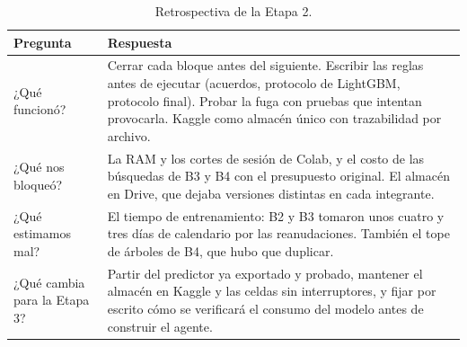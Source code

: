 \begin{table}[H]
  \centering
  \caption{Retrospectiva de la Etapa 2.}
  \label{tab:stage2retro}
  \footnotesize
  \begin{tabularx}{\textwidth}{@{}P{4.0cm} Y@{}}
    \toprule
    \textbf{Pregunta} & \textbf{Respuesta}\\
    \midrule
    ¿Qu\'e funcion\'o? & Cerrar cada bloque antes del siguiente. Escribir las reglas antes de ejecutar (acuerdos, protocolo de LightGBM, protocolo final). Probar la fuga con pruebas que intentan provocarla. Kaggle como almac\'en \'unico con trazabilidad por archivo.\\
    ¿Qu\'e nos bloque\'o? & La RAM y los cortes de sesi\'on de Colab, y el costo de las b\'usquedas de B3 y B4 con el presupuesto original. El almac\'en en Drive, que dejaba versiones distintas en cada integrante.\\
    ¿Qu\'e estimamos mal? & El tiempo de entrenamiento: B2 y B3 tomaron unos cuatro y tres d\'ias de calendario por las reanudaciones. Tambi\'en el tope de \'arboles de B4, que hubo que duplicar.\\
    ¿Qu\'e cambia para la Etapa 3? & Partir del predictor ya exportado y probado, mantener el almac\'en en Kaggle y las celdas sin interruptores, y fijar por escrito c\'omo se verificar\'a el consumo del modelo antes de construir el agente.\\
    \bottomrule
  \end{tabularx}
\end{table}
